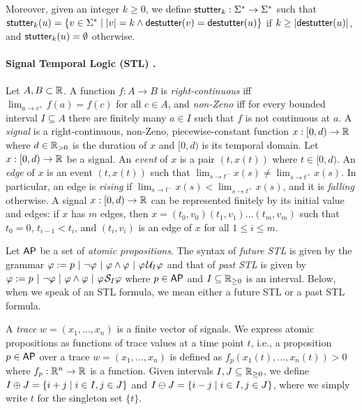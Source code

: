 Moreover, given an integer $k \geq 0$, we define $\mathsf{stutter}_k : \Sigma^* \to \Sigma^*$ such that $\stutter_k(u) = \{v \in \Sigma^* \st |v| = k \land \destutter(v) = \destutter(u)\}$ if $k \geq |\mathsf{destutter}(u)|$, and $\mathsf{stutter}_k(u) = \emptyset$ otherwise.

\paragraph*{Signal Temporal Logic (STL) \cite{MalerN13}.}
Let $A,B \subset \mathbb{R}$.
%
A function $f : A \to B$ is
\emph{right-continuous} iff $\lim_{a \to c^+} f(a) = f(c)$ for all $c \in A$, and
\emph{non-Zeno} iff for every bounded interval $I \subseteq A$ there are finitely many $a \in I$ such that $f$ is not continuous at $a$.
%
A \emph{signal} is a right-continuous, non-Zeno, piecewise-constant function $x : [0,d) \to \mathbb{R}$ where $d \in \mathbb{R}_{> 0}$ is the duration of $x$ and $[0,d)$ is its temporal domain.
Let $x : [0,d) \to \mathbb{R}$ be a signal.
An \emph{event} of $x$ is a pair $(t, x(t))$ where $t \in [0,d)$.
An \emph{edge} of $x$ is an event $(t, x(t))$ such that $\lim_{s \to t^-} x(s) \neq \lim_{s \to t^+} x(s)$.
In particular, an edge is \emph{rising} if $\lim_{s \to t^-} x(s) < \lim_{s \to t^+} x(s)$, and it is \emph{falling} otherwise.
A signal $x : [0,d) \to \mathbb{R}$ can be represented finitely by its initial value and edges: if $x$ has $m$ edges, then $x = (t_0, v_0) (t_1, v_1) \ldots (t_m, v_m)$ such that $t_0 = 0$, $t_{i-1} < t_i$, and $(t_i, v_i)$ is an edge of $x$ for all $1 \leq i \leq m$.

\bgroup \color{red}
Let $\mathsf{AP}$ be a set of \emph{atomic propositions}.
The syntax of \emph{future STL} is given by the grammar $\varphi :=  p ~|~ \lnot \varphi ~|~ \varphi \land \varphi ~|~ \varphi \kern.1em\mathcal{U}_I \varphi$ and that of \emph{past STL} is given by $\varphi :=  p ~|~ \lnot \varphi ~|~ \varphi \land \varphi ~|~ \varphi \kern.1em\mathcal{S}_I \varphi$ where $p \in \mathsf{AP}$ and $I \subseteq \mathbb{R}_{\geq 0}$ is an interval.
Below, when we speak of an STL formula, we mean either a future STL or a past STL formula.
\egroup

A \emph{trace} $w = (x_1, \ldots, x_n)$ is a finite vector of signals.
We express atomic propositions as functions of trace values at a time point $t$,
i.e., a proposition $p \in \mathsf{AP}$ over a trace $w = (x_1, \ldots, x_n)$ is defined as $f_p(x_1(t), \ldots, x_n(t)) > 0$ where $f_p : \mathbb{R}^n \to \mathbb{R}$ is a function.
Given intervals $I,J \subseteq \mathbb{R}_{\geq 0}$, we define $I \oplus J = \{i + j \st i \in I , j \in J\}$ and $I \ominus J = \{i - j \st i \in I , j \in J\}$, where we simply write $t$ for the singleton set $\{t\}$. 

